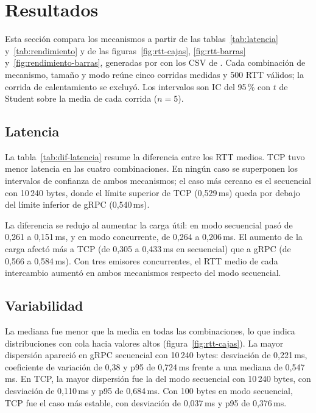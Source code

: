 \section{Resultados}

Esta sección compara los mecanismos a partir de las tablas~\ref{tab:latencia}
y~\ref{tab:rendimiento} y de las figuras~\ref{fig:rtt-cajas}, \ref{fig:rtt-barras}
y~\ref{fig:rendimiento-barras}, generadas por  con los
CSV de . Cada combinación de
mecanismo, tamaño y modo reúne cinco corridas medidas y 500 RTT válidos; la corrida
de calentamiento se excluyó. Los intervalos son IC del 95\,\% con $t$ de Student
sobre la media de cada corrida ($n=5$).

\subsection{Latencia}

La tabla~\ref{tab:dif-latencia} resume la diferencia entre los RTT medios.
TCP tuvo menor latencia en las cuatro combinaciones. En ningún caso se superponen
los intervalos de confianza de ambos mecanismos; el caso más cercano es el secuencial
con 10\,240 bytes, donde el límite superior de TCP (0,529\,ms) queda por debajo del
límite inferior de gRPC (0,540\,ms).



La diferencia se redujo al aumentar la carga útil: en modo secuencial pasó de 0,261
a 0,151\,ms, y en modo concurrente, de 0,264 a 0,206\,ms. El aumento de la carga
afectó más a TCP (de 0,305 a 0,433\,ms en secuencial) que a gRPC (de 0,566 a
0,584\,ms). Con tres emisores concurrentes, el RTT medio de cada intercambio aumentó
en ambos mecanismos respecto del modo secuencial.

\subsection{Variabilidad}

La mediana fue menor que la media en todas las combinaciones, lo que indica
distribuciones con cola hacia valores altos (figura~\ref{fig:rtt-cajas}). La mayor
dispersión apareció en gRPC secuencial con 10\,240 bytes: desviación de 0,221\,ms,
coeficiente de variación de 0,38 y p95 de 0,724\,ms frente a una mediana de
0,547\,ms. En TCP, la mayor dispersión fue la del modo secuencial con 10\,240 bytes,
con desviación de 0,110\,ms y p95 de 0,684\,ms. Con 100 bytes en modo secuencial,
TCP fue el caso más estable, con desviación de 0,037\,ms y p95 de 0,376\,ms.

